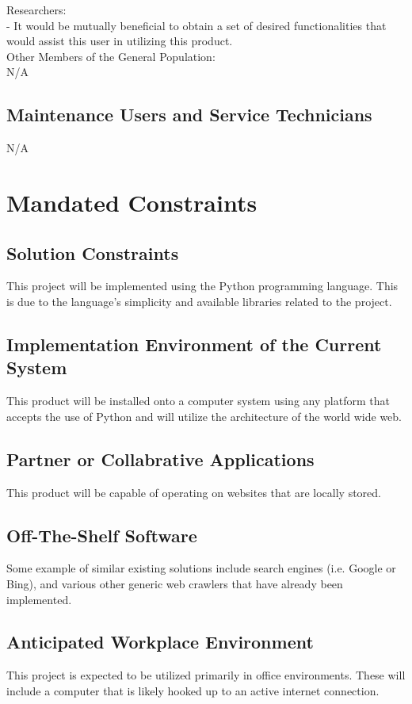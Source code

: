 \documentclass[titlepage]{article}
\begin{document}
Researchers:\\
- It would be mutually beneficial to obtain a set of desired functionalities that would assist this user in utilizing this product.\\

Other Members of the General Population:\\
N/A

\subsection*{Maintenance Users and Service Technicians}
N/A


\section{Mandated Constraints}

\subsection*{Solution Constraints}
	This project will be implemented using the Python programming language. This is due to the language’s simplicity and available libraries related to the project.

\subsection*{Implementation Environment of the Current System}
This product will be installed onto a computer system using any platform that accepts the use of Python and will utilize the architecture of the world wide web.

\subsection*{Partner or Collabrative Applications}
This product will be capable of operating on websites that are locally stored.

\subsection*{Off-The-Shelf Software}
Some example of similar existing solutions include search engines (i.e. Google or Bing), and various other generic web crawlers that have already been implemented.

\subsection*{Anticipated Workplace Environment}
This project is expected to be utilized primarily in office environments. These will include a computer that is likely hooked up to an active internet connection.
\end{document}
